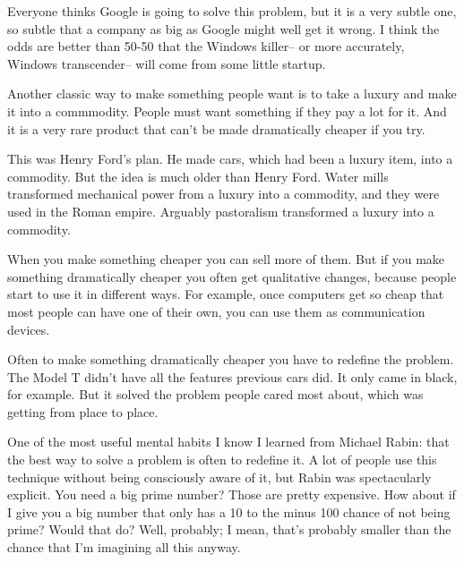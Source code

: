 Everyone thinks
                    Google is going to solve this problem, but it is a very
                    subtle one, so subtle that a company as big as Google might
                    well get it wrong. I think the odds are better than 50-50
                    that the Windows killer-- or more accurately, Windows
                    transcender-- will come from some little startup.

Another
                    classic way to make something people want is to take a
                    luxury and make it into a commmodity. People must want
                    something if they pay a lot for it. And it is a very rare
                    product that can't be made dramatically cheaper if you
                    try.

This was Henry Ford's plan. He made cars,
                    which had been a luxury item, into a commodity. But the idea
                    is much older than Henry Ford. Water mills transformed
                    mechanical power from a luxury into a commodity, and they
                    were used in the Roman empire. Arguably pastoralism
                    transformed a luxury into a commodity.

When you
                    make something cheaper you can sell more of them. But if you
                    make something dramatically cheaper you often get
                    qualitative changes, because people start to use it in
                    different ways. For example, once computers get so cheap
                    that most people can have one of their own, you can use them
                    as communication devices.

Often to make something
                    dramatically cheaper you have to redefine the problem. The
                    Model T didn't have all the features previous cars did. It
                    only came in black, for example. But it solved the problem
                    people cared most about, which was getting from place to
                    place.

One of the most useful mental habits I
                    know I learned from Michael Rabin: that the best way to
                    solve a problem is often to redefine it. A lot of people use
                    this technique without being consciously aware of it, but
                    Rabin was spectacularly explicit. You need a big prime
                    number? Those are pretty expensive. How about if I give you
                    a big number that only has a 10 to the minus 100 chance of
                    not being prime? Would that do? Well, probably; I mean,
                    that's probably smaller than the chance that I'm imagining
                    all this anyway.

